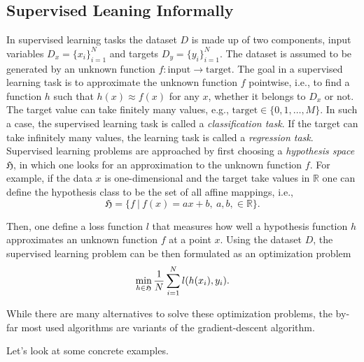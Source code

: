 \subsection{Supervised Leaning Informally}
In supervised learning tasks the dataset $D$ is made up of
two components, input variables $D_x = \{x_i\}_{i = 1}^N$ and targets $D_y = \{y_i\}_{i=1}^N$. The dataset is assumed to be
generated by an unknown function $f: \text{input} \to \text{target}$. The goal in
a supervised learning task is to approximate the unknown function $f$ pointwise,
i.e., to find a function $h$ such that $h(x) \approx f(x)$ for any $x$, whether
it belongs to $D_x$ or not. The target value can take finitely many values,
e.g., $\text{target} \in \{0,1, \dots, M\}$. In such a case, the supervised
learning task is called a \emph{classification task}. If the target can take
infinitely many values, the learning task is called a \emph{regression task}.  
Supervised learning problems are approached by first choosing a \emph{hypothesis
space} $\mathfrak{H}$, in which one looks for an approximation to the unknown function $f$. For example, if the data $x$ is one-dimensional and the target
take values in $\mathbb{R}$ one can define the hypothesis class to be the set of
all affine mappings, i.e., 
\begin{equation}
    \label{eq:affine_mappings}
\mathfrak{H} = \bigl\{f \ | \ f(x) = ax + b, \ a, b, \in \mathbb{R}    
\bigr\}.
\end{equation}

Then, one define a loss function $l$ that measures how well a hypothesis
function $h$ approximates an unknown function $f$ at a point $x$. Using the
dataset $D$, the supervised learning
problem can be then formulated as an optimization problem 
\begin{equation}
    \min_{h \in \frak{H}} \frac{1}{N}\sum_{i=1}^{N}l(h(x_i), y_i).
\end{equation}

While there are many alternatives to solve these optimization problems, the
by-far most used algorithms are variants of the gradient-descent algorithm. 

Let's look at some concrete examples. 

